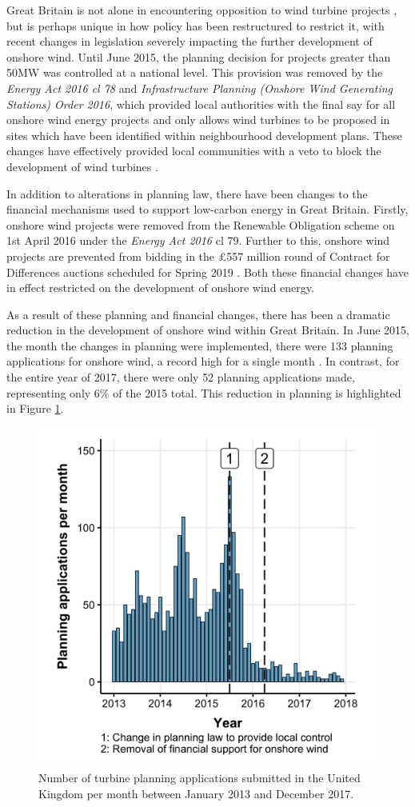 \documentclass[a4paper,]{article}
\theoremstyle{definition}
\theoremstyle{definition}
\theoremstyle{definition}
\theoremstyle{remark}
\begin{document}
Great Britain is not alone in encountering opposition to wind turbine projects \citep{Langer2016}, but is perhaps unique in how policy has been restructured to restrict it, with recent changes in legislation severely impacting the further development of onshore wind. Until June 2015, the planning decision for projects greater than 50MW was controlled at a national level. This provision was removed by the \emph{Energy Act 2016 cl 78} and \emph{Infrastructure Planning (Onshore Wind Generating Stations) Order 2016}, which provided local authorities with the final say for all onshore wind energy projects and only allows wind turbines to be proposed in sites which have been identified within neighbourhood development plans. These changes have effectively provided local communities with a veto to block the development of wind turbines \citep{Cowell2018}.

In addition to alterations in planning law, there have been changes to the financial mechanisms used to support low-carbon energy in Great Britain. Firstly, onshore wind projects were removed from the Renewable Obligation scheme on 1st April 2016 under the \emph{Energy Act 2016} cl 79. Further to this, onshore wind projects are prevented from bidding in the £557 million round of Contract for Differences auctions scheduled for Spring 2019 \citep{Smith2016}. Both these financial changes have in effect restricted on the development of onshore wind energy.

As a result of these planning and financial changes, there has been a dramatic reduction in the development of onshore wind within Great Britain. In June 2015, the month the changes in planning were implemented, there were 133 planning applications for onshore wind, a record high for a single month \citep{DECC2018}. In contrast, for the entire year of 2017, there were only 52 planning applications made, representing only 6\% of the 2015 total. This reduction in planning is highlighted in Figure \ref{fig:numberApplications}.



\begin{figure}[h]

{\centering \includegraphics[width=0.5\linewidth]{figures/figure2} 

}

\caption{Number of turbine planning applications submitted in the United Kingdom per month between January 2013 and December 2017.}\label{fig:numberApplications}
\end{figure}
\end{document}
